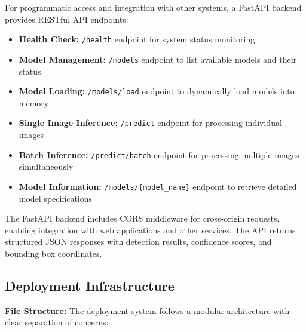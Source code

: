 \documentclass[12pt,a4paper]{article}
\begin{document}
For programmatic access and integration with other systems, a FastAPI backend provides RESTful API endpoints:

\begin{itemize}
    \item \textbf{Health Check:} \texttt{/health} endpoint for system status monitoring
    \item \textbf{Model Management:} \texttt{/models} endpoint to list available models and their status
    \item \textbf{Model Loading:} \texttt{/models/load} endpoint to dynamically load models into memory
    \item \textbf{Single Image Inference:} \texttt{/predict} endpoint for processing individual images
    \item \textbf{Batch Inference:} \texttt{/predict/batch} endpoint for processing multiple images simultaneously
    \item \textbf{Model Information:} \texttt{/models/\{model\_name\}} endpoint to retrieve detailed model specifications
\end{itemize}

The FastAPI backend includes CORS middleware for cross-origin requests, enabling integration with web applications and other services. The API returns structured JSON responses with detection results, confidence scores, and bounding box coordinates.

\subsection{Deployment Infrastructure}

\textbf{File Structure:}
The deployment system follows a modular architecture with clear separation of concerns:
\end{document}
